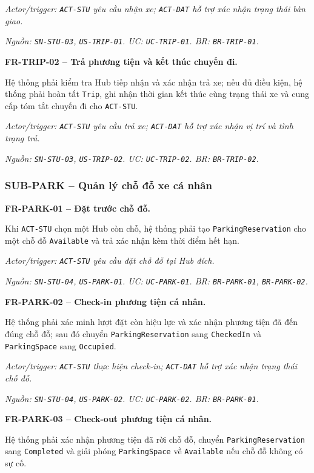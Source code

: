 \textit{Actor/trigger: \texttt{ACT-STU} yêu cầu nhận xe; \texttt{ACT-DAT} hỗ trợ xác nhận trạng thái bàn giao.}\par
\textit{Nguồn: \texttt{SN-STU-03}, \texttt{US-TRIP-01}. UC: \texttt{UC-TRIP-01}. BR: \texttt{BR-TRIP-01}.}

\medskip
\noindent\textbf{FR-TRIP-02 -- Trả phương tiện và kết thúc chuyến đi.}\par
\nopagebreak[4]
Hệ thống phải kiểm tra Hub tiếp nhận và xác nhận trả xe; nếu đủ điều kiện, hệ thống phải hoàn tất \texttt{Trip}, ghi nhận thời gian kết thúc cùng trạng thái xe và cung cấp tóm tắt chuyến đi cho \texttt{ACT-STU}.

\textit{Actor/trigger: \texttt{ACT-STU} yêu cầu trả xe; \texttt{ACT-DAT} hỗ trợ xác nhận vị trí và tình trạng trả.}\par
\textit{Nguồn: \texttt{SN-STU-03}, \texttt{US-TRIP-02}. UC: \texttt{UC-TRIP-02}. BR: \texttt{BR-TRIP-02}.}

\subsubsection{SUB-PARK -- Quản lý chỗ đỗ xe cá nhân}

\noindent\textbf{FR-PARK-01 -- Đặt trước chỗ đỗ.}\par
\nopagebreak[4]
Khi \texttt{ACT-STU} chọn một Hub còn chỗ, hệ thống phải tạo \texttt{ParkingReservation} cho một chỗ đỗ \texttt{Available} và trả xác nhận kèm thời điểm hết hạn.

\textit{Actor/trigger: \texttt{ACT-STU} yêu cầu đặt chỗ đỗ tại Hub đích.}\par
\textit{Nguồn: \texttt{SN-STU-04}, \texttt{US-PARK-01}. UC: \texttt{UC-PARK-01}. BR: \texttt{BR-PARK-01}, \texttt{BR-PARK-02}.}

\medskip
\noindent\textbf{FR-PARK-02 -- Check-in phương tiện cá nhân.}\par
\nopagebreak[4]
Hệ thống phải xác minh lượt đặt còn hiệu lực và xác nhận phương tiện đã đến đúng chỗ đỗ; sau đó chuyển \texttt{ParkingReservation} sang \texttt{CheckedIn} và \texttt{ParkingSpace} sang \texttt{Occupied}.

\textit{Actor/trigger: \texttt{ACT-STU} thực hiện check-in; \texttt{ACT-DAT} hỗ trợ xác nhận trạng thái chỗ đỗ.}\par
\textit{Nguồn: \texttt{SN-STU-04}, \texttt{US-PARK-02}. UC: \texttt{UC-PARK-02}. BR: \texttt{BR-PARK-01}.}

\medskip
\noindent\textbf{FR-PARK-03 -- Check-out phương tiện cá nhân.}\par
\nopagebreak[4]
Hệ thống phải xác nhận phương tiện đã rời chỗ đỗ, chuyển \texttt{ParkingReservation} sang \texttt{Completed} và giải phóng \texttt{ParkingSpace} về \texttt{Available} nếu chỗ đỗ không có sự cố.

